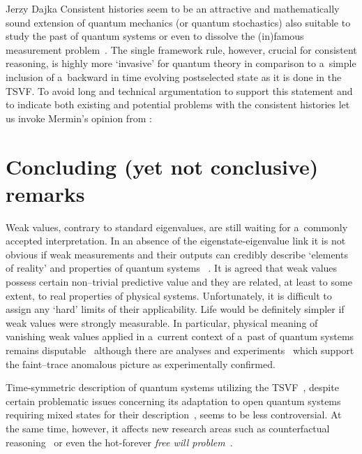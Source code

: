 \begin{artengenv}{Jerzy Dajka}
%
Consistent histories seem to be an attractive and mathematically sound extension of quantum mechanics (or quantum stochastics) also suitable to study the past of quantum systems  or even  to dissolve the  (in)famous measurement problem~\parencite{GRIFFITHS_measur,Griffiths_reason}. The single framework rule, however, crucial for consistent reasoning, is highly more `invasive' for quantum theory in comparison to a~simple inclusion of a~backward in time evolving postselected state as it is done in the TSVF. To avoid long and technical argumentation  to support this statement and to indicate both existing and potential problems with the consistent histories let us invoke Mermin's opinion from   
\parencite*{mermin}:

\section{Concluding (yet not conclusive) remarks}

Weak values, contrary to standard eigenvalues, are still waiting for a~commonly accepted interpretation. In an absence of the eigenstate-eigenvalue link it is not obvious if weak measurements and their outputs can credibly describe `elements of reality' and properties of quantum systems ~\parencite{Matzkin_prop,vaid_trans}. It is agreed that weak values possess certain non--trivial predictive value and they are related, at least to some extent, to real properties of physical systems. Unfortunately, it is difficult to assign any `hard' limits of their applicability. Life would be definitely simpler if weak values were strongly measurable. In particular,  
  physical meaning of vanishing weak values applied in  a~current context of a~past of quantum systems  remains disputable~\parencite{PhysRevA.95.032110,PhysRevA.97.046102,PhysRevA.97.046103,weak,lady} although  there are analyses and experiments~\parencite{e20110854,PhysRevA.101.052119,pnas,pnas1} which support the faint--trace anomalous picture as experimentally confirmed.   

Time-symmetric description of quantum systems utilizing the TSVF~\parencite{aharonov_entrop,Aharonov2008}, despite certain problematic issues concerning its adaptation to open quantum systems requiring mixed states for their description~\parencite{weak,scirep},   seems to be less controversial. At the same time, however, it affects new research areas such as counterfactual reasoning~\parencite{kont0}  or even the hot-forever {\it free will problem}~\parencite{wil}. 


\end{artengenv}
